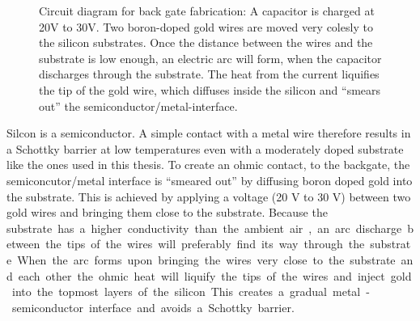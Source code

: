 \begin{figure}
	\centering
	\caption{Circuit diagram for back gate fabrication: A capacitor is charged at 20V to 30V. Two boron-doped gold wires are moved very colesly to the silicon substrates. Once the distance between the wires and the substrate is low enough, an electric arc will form, when the capacitor discharges through the substrate. The heat from the current liquifies the tip of the gold wire, which diffuses inside the silicon and ``smears out'' the semiconductor/metal-interface.}\label{arc}
\end{figure}

Silcon is a semiconductor. A simple contact with a metal wire therefore results in a Schottky barrier at low temperatures even with a moderately doped substrate like the ones used in this thesis. To create an ohmic contact, to the backgate, the semiconcutor/metal interface is ``smeared out'' by diffusing boron doped gold into the substrate. This is achieved by applying a voltage (20 V to 30 V) between two gold wires and bringing them close to the substrate. Because the \si substrate has a higher conductivity than the ambient air, an arc discharge between the tips of the wires will preferably find its way through the substrate. When the arc forms upon bringing the wires very close to the substrate and each other the ohmic heat will liquify the tips of the wires and inject gold into the topmost layers of the silicon. This creates a gradual metal-semiconductor interface and avoids a Schottky barrier.

